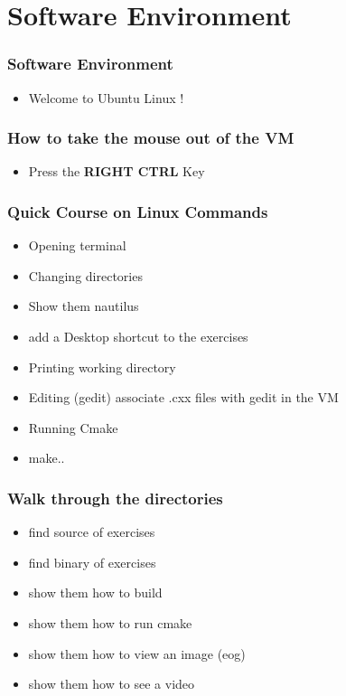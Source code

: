 \section{Software Environment}


\begin{frame}
\frametitle{Software Environment}
\begin{itemize}
\item Welcome to Ubuntu Linux !
\end{itemize}
\end{frame}

\begin{frame}
\frametitle{How to take the mouse out of the VM}
\begin{itemize}
\item Press the \textbf{RIGHT CTRL} Key
\end{itemize}
\end{frame}

\begin{frame}
\frametitle{Quick Course on Linux Commands}
\begin{itemize}
\item Opening terminal
\item Changing directories
\item Show them nautilus
\item add a Desktop shortcut to the exercises
\item Printing working directory
\item Editing (gedit) associate .cxx files with gedit in the VM
\item Running Cmake
\item make..
\end{itemize}
\end{frame}


\begin{frame}
\frametitle{Walk through the directories}
\begin{itemize}
\item find source of exercises
\item find binary of exercises
\item show them how to build
\item show them how to run cmake
\item show them how to view an image (eog)
\item show them how to see a video
\end{itemize}
\end{frame}
